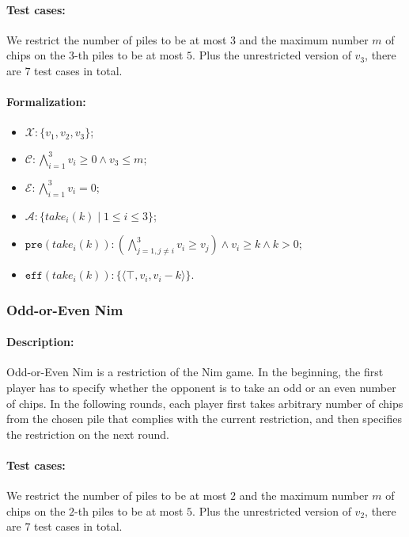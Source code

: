 \documentclass[review]{elsarticle}
\newcommand{\set}[1]{\{ #1 \}}
\newcommand{\tuple}[1]{\langle {#1} \rangle}
\newcommand{\true}{\top}
\newcommand{\statevar}{\mathcal{X}}
\newcommand{\act}{\mathcal{A}}
\newcommand{\constraint}{\mathcal{C}}
\newcommand{\estate}{\mathcal{E}}
\newcommand{\pre}{\mathtt{pre}}
\newcommand{\eff}{\mathtt{eff}}
\begin{document}
\paragraph{Test cases:}
We restrict the number of piles to be at most $3$ and the maximum number $m$ of chips on the $3$-th piles to be at most $5$. 
Plus the unrestricted version of $v_3$, there are $7$ test cases in total.

\paragraph{Formalization:}
\begin{itemize}
	\item $\statevar: \set{v_1, v_2, v_3}$;
	\item $\constraint:\bigwedge_{i=1}^{3} v_i \ge 0 \wedge v_3 \le m$;
	\item $\estate: \bigwedge_{i=1}^{3} v_i = 0$;
	\item $\act:\set{take_i(k) {\mid}1\le i \le 3}$;
	\item $\pre(take_i(k)) : (\bigwedge_{j=1,j\neq i}^{3} v_i \ge v_j) \wedge v_i \ge k \wedge  k > 0$;
	\item $\eff(take_i(k)) : \set{\tuple{\true, v_i, v_i-k}}$.
\end{itemize}

\subsubsection{Odd-or-Even Nim \protect\cite{SmiS2002}}

\paragraph{Description:} 
Odd-or-Even Nim is a restriction of the Nim game.
In the beginning, the first player has to specify whether the opponent is to take an odd or an even number of chips. 
In the following rounds, each player first takes arbitrary number of chips from the chosen pile that complies with the current restriction, and then specifies the restriction on the next round.

\paragraph{Test cases:}
We restrict the number of piles to be at most $2$ and the maximum number $m$ of chips on the $2$-th piles to be at most $5$. 
Plus the unrestricted version of $v_2$, there are $7$ test cases in total.
\end{document}
